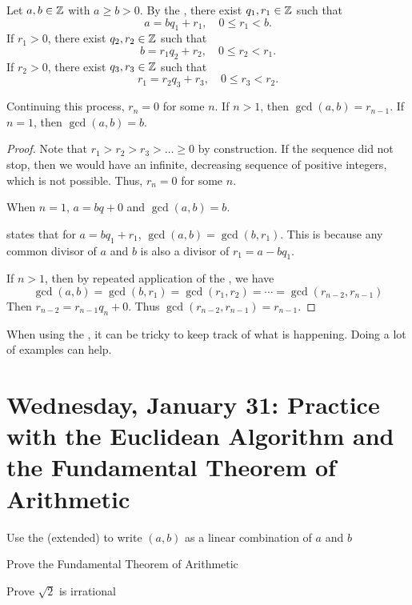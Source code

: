 \documentclass{ximera}
\begin{document}
\begin{thm*}\label{euclid-alg}
	Let $a,b\in\mathbb Z$ with $a\geq b>0$. By the , there exist $q_1,r_1\in\mathbb Z$ such that 
	\[a=b q_1+r_1,\quad 0\leq r_1<b.\]
	If $r_1>0$, there exist $q_2,r_2\in\mathbb Z$ such that 
	\[b=r_1 q_2+r_2,\quad 0\leq r_2<r_1.\]
	If $r_2>0$, there exist $q_3,r_3\in\mathbb Z$ such that 
	\[r_1=r_2 q_3+r_3,\quad 0\leq r_3<r_2.\]
	
	Continuing this process, $r_n=0$ for some $n$. If $n>1$, then $\gcd(a,b)=r_{n-1}$. If $n=1$, then $\gcd(a,b)=b$.
\end{thm*}
\begin{proof}
	 Note that $r_1>r_2>r_3>\dots\geq0$ by construction. If the sequence did not stop, then we would have an infinite, decreasing sequence of positive integers, which is not possible. Thus, $r_n=0$ for some $n$. 
	 
	 When $n=1$, $a=bq+0$ and $\gcd(a,b)=b$.
	 
	  states that for $a=bq_1+r_1$, $\gcd(a,b)=\gcd(b,r_1)$. This is because any common divisor of $a$ and $b$  is also a divisor of $r_1=a-bq_1$. 
	 
	 If $n>1$, then by repeated application of the , we have 
	 \[\gcd(a,b)=\gcd(b,r_1)=\gcd(r_1,r_2)=\cdots=\gcd(r_{n-2},r_{n-1})\]
	 Then $r_{n-2}=r_{n-1} q_n+0$. Thus $\gcd(r_{n-2},r_{n-1})=r_{n-1}$.
\end{proof}
	
When using the , it can be tricky to keep track of what is happening. Doing a lot of examples can help.
	
\section{Wednesday, January 31: Practice with the Euclidean Algorithm and the Fundamental Theorem of Arithmetic}

\begin{obj}
\item  Use the (extended)  to write $(a,b)$ as a linear combination of $a$ and $b$
\item Prove the Fundamental Theorem of Arithmetic
\item  Prove $\sqrt{2}$ is irrational
\end{obj}
\end{document}
